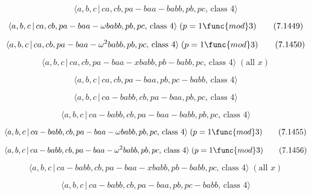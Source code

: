\documentclass[10pt]{article}
\begin{document}
\begin{equation}
\langle a,b,c\,|\,ca,cb,pa-baa-babb,pb,pc,\,\text{class }4\rangle 
\tag{7.1448}
\end{equation}

\begin{equation}
\langle a,b,c\,|\,ca,cb,pa-baa-\omega babb,pb,pc,\,\text{class }4\rangle
\;(p=1\func{mod}3)  \tag{7.1449}
\end{equation}

\begin{equation}
\langle a,b,c\,|\,ca,cb,pa-baa-\omega ^{2}babb,pb,pc,\,\text{class }4\rangle
\;(p=1\func{mod}3)  \tag{7.1450}
\end{equation}

\begin{equation}
\langle a,b,c\,|\,ca,cb,pa-baa-xbabb,pb-babb,pc,\,\text{class }4\rangle \;(%
\text{all }x)  \tag{7.1451}
\end{equation}

\begin{equation}
\langle a,b,c\,|\,ca,cb,pa-baa,pb,pc-babb,\,\text{class }4\rangle 
\tag{7.1452}
\end{equation}

\begin{equation}
\langle a,b,c\,|\,ca-babb,cb,pa-baa,pb,pc,\,\text{class }4\rangle 
\tag{7.1453}
\end{equation}

\begin{equation}
\langle a,b,c\,|\,ca-babb,cb,pa-baa-babb,pb,pc,\,\text{class }4\rangle 
\tag{7.1454}
\end{equation}

\begin{equation}
\langle a,b,c\,|\,ca-babb,cb,pa-baa-\omega babb,pb,pc,\,\text{class }%
4\rangle \;(p=1\func{mod}3)  \tag{7.1455}
\end{equation}

\begin{equation}
\langle a,b,c\,|\,ca-babb,cb,pa-baa-\omega ^{2}babb,pb,pc,\,\text{class }%
4\rangle \;(p=1\func{mod}3)  \tag{7.1456}
\end{equation}

\begin{equation}
\langle a,b,c\,|\,ca-babb,cb,pa-baa-xbabb,pb-babb,pc,\,\text{class }4\rangle
\;(\text{all }x)  \tag{7.1457}
\end{equation}

\begin{equation}
\langle a,b,c\,|\,ca-babb,cb,pa-baa,pb,pc-babb,\,\text{class }4\rangle 
\tag{7.1458}
\end{equation}
\end{document}
